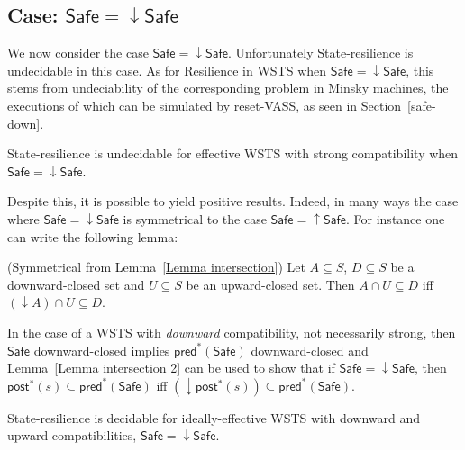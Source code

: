 \documentclass[runningheads]{llncs}
\newcommand{\pred}{\textsf{pred}}
\newcommand{\post}{\textsf{post}}
\newcommand{\Safe}{\textsf{Safe}}
\begin{document}
\subsection{Case: $\Safe = \downarrow \Safe$}


We now consider the case $\Safe = \downarrow \Safe$.
%
Unfortunately {\sc State-resilience} is undecidable in this case. As for {\sc Resilience} in WSTS when $\Safe = \downarrow \Safe$, this stems from undeciability of the corresponding problem in Minsky machines, the executions of which can be simulated by reset-VASS, as seen in 
Section~\ref{safe-down}.

\begin{theorem}\label{srp down up}
{\sc State-resilience} is undecidable for effective WSTS with  strong  compatibility 
when
$\Safe=\downarrow \Safe$.
\end{theorem}



Despite this, it is possible to yield positive results. Indeed, in many ways the case where $\Safe = \downarrow \Safe$
is symmetrical to the case $\Safe = \uparrow \Safe$.
%
For instance one can write the following lemma:

\begin{lemma}(Symmetrical from Lemma~\ref{Lemma intersection})\label{Lemma intersection 2}
Let $A \subseteq S$, $D \subseteq S$ be a downward-closed set and $U \subseteq S$ be an upward-closed set. 
Then $A \cap U \subseteq D$  iff $ (\downarrow  A) \cap U \subseteq D$.
\end{lemma}




In the case of a WSTS with \emph{downward} compatibility, not necessarily strong,
then $\Safe$ downward-closed implies $\pred^*(\Safe)$ downward-closed and
Lemma~\ref{Lemma intersection 2} can be used to show that
if $\Safe = \downarrow \Safe$,
then
$\post^*(s)  
\subseteq \pred^*(\Safe)$  iff $ (\downarrow  \post^*(s)) 
\subseteq \pred^*(\Safe)$.


\begin{theorem}\label{downward srp}
{\sc State-resilience} is decidable for ideally-effective WSTS with downward and upward compatibilities,
$\Safe = \downarrow \Safe$.
\end{theorem}
\end{document}
